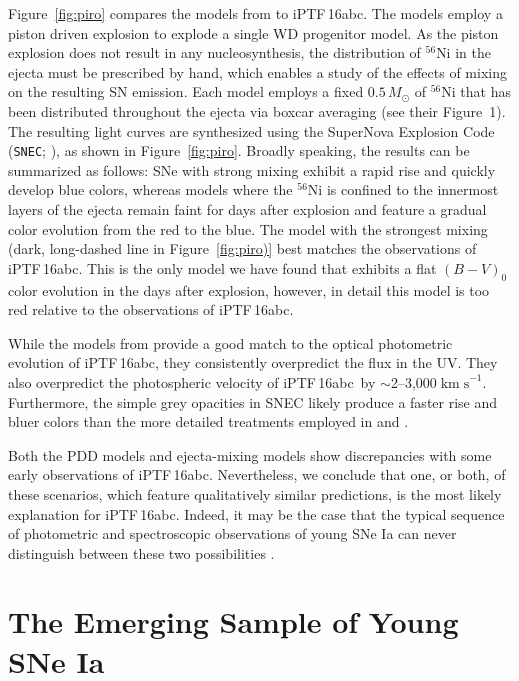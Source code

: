 \documentclass[twocolumn]{aastex61}
\newcommand{\sm}{M_\odot}
\newcommand{\abc}{iPTF\,16abc}
\newcommand{\sneia}{SNe Ia}
\begin{document}
Figure~\ref{fig:piro} compares the models from \citet{2016ApJ...826...96P} to
\abc. The \citeauthor{2016ApJ...826...96P} models employ a piston driven
explosion to explode a single WD progenitor model. As the piston explosion
does not result in any nucleosynthesis, the distribution of $^{56}$Ni in the
ejecta must be prescribed by hand, which enables a study of the effects of
mixing on the resulting SN emission. Each model employs a fixed $0.5\,\sm$ of
$^{56}$Ni that has been distributed throughout the ejecta via boxcar averaging
(see their Figure~1). The resulting light curves are synthesized using the
SuperNova Explosion Code (\texttt{SNEC}; \citealt{2015ApJ...814...63M}), as
shown in Figure~\ref{fig:piro}. Broadly speaking, the results can be
summarized as follows: SNe with strong mixing exhibit a rapid rise and quickly
develop blue colors, whereas models where the $^{56}$Ni is confined to the
innermost layers of the ejecta remain faint for days after explosion and
feature a gradual color evolution from the red to the blue. The model
with the strongest mixing (dark, long-dashed line in Figure~\ref{fig:piro)}
best matches the observations of \abc. This is the only model we have found
that exhibits a flat $(B-V)_0$ color evolution in the days after explosion,
however, in detail this model is too red relative to the observations of \abc.


While the models from \citet{2016ApJ...826...96P} provide a good match to the
optical photometric evolution of \abc, they consistently overpredict the flux
in the UV. They also overpredict the photospheric velocity of \abc\
by $\sim$2--3,000$\; \mathrm{km \; s}^{-1}$. Furthermore, the simple
grey opacities in SNEC likely produce a faster rise and bluer colors than the
more detailed treatments employed in \citet{2014MNRAS.441..532D} and
\citet{2017MNRAS.472.2787N}.

Both the PDD models and ejecta-mixing models show discrepancies with some
early observations of \abc. Nevertheless, we conclude that one, or both, of
these scenarios, which feature qualitatively similar predictions, is the most
likely explanation for \abc. Indeed, it may be the case that the typical
sequence of photometric and spectroscopic observations of young SNe Ia can
never distinguish between these two possibilities \citep{2017MNRAS.472.2787N}.

\section{The Emerging Sample of Young \sneia}
\end{document}
